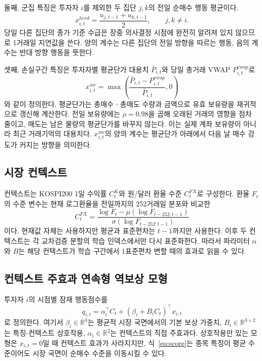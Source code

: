 \documentclass[sigconf,nonacm]{acmart}
\begin{document}
둘째, 군집 특징은 투자자 $i$를 제외한 두 집단 $j,k$의 전일 순매수 행동 평균이다.
\begin{equation}
x^{herd}_{i,t}=\frac{u_{j,t-1}+u_{k,t-1}}{2},\qquad j,k\neq i.
\label{eq:herd}
\end{equation}
당일 다른 집단의 종가 기준 수급은 장중 의사결정 시점에 완전히 알려져 있지 않으므로
1거래일 지연값을 쓴다. 양의 계수는 다른 집단의 전일 방향을 따르는 행동, 음의
계수는 반대 방향 행동을 뜻한다.

셋째, 손실구간 특징은 투자자별 평균단가 대용치 $\bar P_{i,t}$와 당일 총거래
VWAP $P^{vwap}_{i,t}$로
\begin{equation}
x^{uw}_{i,t}=\max\left(
\frac{\bar P_{i,t}-P^{vwap}_{i,t}}{\bar P_{i,t}},0\right)
\label{eq:underwater}
\end{equation}
와 같이 정의한다. 평균단가는 총매수ㆍ총매도 수량과 금액으로 유효 보유량을
재귀적으로 갱신해 계산한다. 전일 보유량에는 $\rho=0.98$을 곱해 오래된 거래의
영향을 점차 줄이고, 매도는 남은 물량의 평균단가를 바꾸지 않는다. 이는 실제 계좌
보유량이 아니라 최근 거래기억의 대용치다. $x^{uw}_{i,t}$의 양의 계수는 평균단가
아래에서 다음 날 매수 강도가 커지는 방향을 의미한다.

\subsection{시장 컨텍스트}

컨텍스트는 KOSPI200 1일 수익률 $C^{K}_{t}$와 원/달러 환율 수준
$C^{FX}_{t}$로 구성한다. 환율 $F_t$의 수준 변수는 현재 로그환율을 전일까지의
252거래일 분포와 비교한
\begin{equation}
C^{FX}_{t}=
\frac{\log F_t-\mu(\log F_{t-252:t-1})}
{\sigma(\log F_{t-252:t-1})}
\label{eq:fxcontext}
\end{equation}
이다. 현재값 자체는 사용하지만 평균과 표준편차는 $t-1$까지만 사용한다. 이후 두
컨텍스트는 각 교차검증 분할의 학습 인덱스에서만 다시 표준화한다. 따라서 파라미터
$\alpha$와 $B$는 해당 컨텍스트가 학습 구간에서 1표준편차 변할 때의 효과로 읽을
수 있다.

\subsection{컨텍스트 주효과 연속형 역보상 모형}

투자자 $i$의 시점별 잠재 행동점수를
\begin{equation}
q_{i,t}=\alpha_i^\top C_t+
\left(\beta_i+B_i C_t\right)^\top x_{i,t}
\label{eq:score}
\end{equation}
로 정의한다. 여기서 $\beta_i\in\mathbb{R}^{3}$는 평균적 시장 국면에서의 기본
보상 가중치, $B_i\in\mathbb{R}^{3\times2}$는 특징-컨텍스트 상호작용,
$\alpha_i\in\mathbb{R}^{2}$는 컨텍스트의 직접 주효과다. 상호작용만 있는 모형은
$x_{i,t}=0$일 때 컨텍스트 효과가 사라지지만, 식~\ref{eq:score}는 종목 특징이
평균 수준이어도 시장 국면이 순매수 수준을 이동시킬 수 있다.
\end{document}
